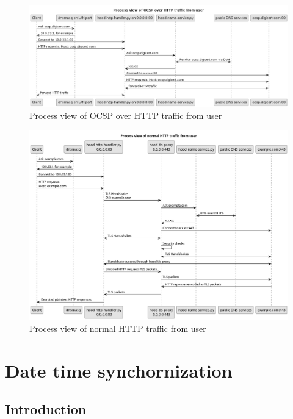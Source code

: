 \documentclass[mscthesis]{usiinfthesis}
\begin{document}
\begin{landscape}
  \begin{figure}[H]
    \includegraphics[width=\linewidth]{graphics/puml/process-ocsp-traffic.png}
    \caption{Process view of OCSP over HTTP traffic from user}
    \label{fig:ocsp-process-view}
  \end{figure}

  \begin{figure}[H]
    \includegraphics[width=\linewidth]{graphics/puml/process-http-traffic.png}
    \caption{Process view of normal HTTP traffic from user}
    \label{fig:http-process-view}
  \end{figure}
\end{landscape}

\chapter{Date time synchornization}\label{cha:time}
\section{Introduction}
\end{document}
